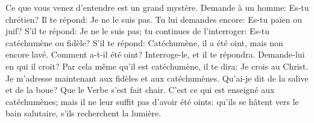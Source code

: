 Ce que vous venez d’entendre est un grand mystère.
Demande à un homme: Es-tu chrétien?
	Il te répond: Je ne le suis pas.
Tu lui demandes encore: Es-tu païen ou juif?
	S’il te répond: Je ne le suis pas; tu continues de l’interroger:
	Es-tu catéchumène ou fidèle?
	S’il te répond: Catéchumène, il a été oint, mais non encore lavé.
Comment a-t-il été oint?
	Interroge-le, et il te répondra.
Demande-lui en qui il croit? Par cela même qu’il est catéchumène, il te dira:
	Je crois au Christ.
Je m’adresse maintenant aux fidèles et aux catéchumènes.
Qu’ai-je dit de la salive et de la boue? Que le Verbe s’est fait chair.
C’est ce qui est enseigné aux catéchumènes;
	mais il ne leur suffit pas d’avoir été oints:
	qu’ils se hâtent vers le bain salutaire, s’ils recherchent la lumière.
